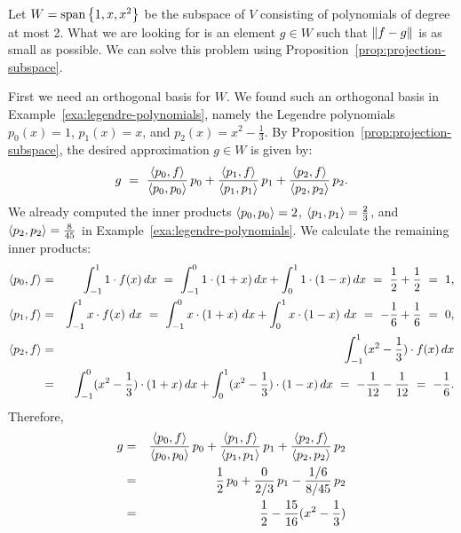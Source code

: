 \begin{solution}
  Let $W=\sspan\set{1,x,x^2}$ be the subspace of $V$ consisting of
  polynomials of degree at most 2. What we are looking for is an
  element $g\in W$ such that $\left\|f-g\right\|$ is as small as possible.  We
  can solve this problem using
  Proposition~\ref{prop:projection-subspace}.

  First we need an orthogonal basis for $W$. We found such an
  orthogonal basis in Example~\ref{exa:legendre-polynomials}, namely
  the Legendre polynomials $p_0(x) = 1$, $p_1(x) = x$, and
  $p_2(x) = x^2-\frac{1}{3}$.  By
  Proposition~\ref{prop:projection-subspace}, the desired
  approximation $g\in W$ is given by:
  \begin{equation*}
    g
    ~=~
    \frac{\langle p_0,f\rangle}{\langle p_0,p_0\rangle}\,p_0
    + \frac{\langle p_1,f\rangle}{\langle p_1,p_1\rangle}\,p_1
    + \frac{\langle p_2,f\rangle}{\langle p_2,p_2\rangle}\,p_2.
  \end{equation*}
  We already computed the inner products $\langle p_0,p_0\rangle=2$,
  $\langle p_1,p_1\rangle=\frac{2}{3}$, and $\langle p_2,p_2\rangle=\frac{8}{45}$ in
  Example~\ref{exa:legendre-polynomials}. We calculate the remaining
  inner products:
  \begin{eqnarray*}
    \langle p_0,f\rangle
    &=& \int_{-1}^{1} 1\cdot f(x)\,dx
        ~=~ \int_{-1}^{0} 1\cdot (1+x)\,dx
        +   \int_{0}^{1} 1\cdot (1-x)\,dx
        ~=~ \frac{1}{2} + \frac{1}{2}
        ~=~ 1, \\
    \langle p_1,f\rangle
    &=& \int_{-1}^{1} x\cdot f(x)\,\,dx
        ~=~ \int_{-1}^{0} x\cdot (1+x)\,\,dx
        +   \int_{0}^{1} x\cdot (1-x)\,\,dx
        ~=~ -\frac{1}{6} + \frac{1}{6}
        ~=~ 0, \\
    \langle p_2,f\rangle
    &=& \int_{-1}^{1} (x^2-\frac{1}{3})\cdot f(x)\,dx \\
    &=& \int_{-1}^{0} (x^2-\frac{1}{3})\cdot (1+x)\,dx
        +   \int_{0}^{1} (x^2-\frac{1}{3})\cdot (1-x)\,dx
        ~=~ - \frac{1}{12} - \frac{1}{12}
        ~=~ -\frac{1}{6}.
  \end{eqnarray*}
  Therefore,
  \begin{eqnarray*}
    g
    &=&
    \frac{\iprod{p_0,f}}{\iprod{p_0,p_0}}\,p_0
        + \frac{\iprod{p_1,f}}{\iprod{p_1,p_1}}\,p_1
        + \frac{\iprod{p_2,f}}{\iprod{p_2,p_2}}\,p_2
    \\
    &=& \frac{1}{2}\,p_0
        + \frac{0}{2/3}\,p_1
        - \frac{1/6}{8/45}\,p_2
    \\
    &=& \frac{1}{2}
        - \frac{15}{16}(x^2-\frac{1}{3})
    \\

\end{eqnarray*}
\end{solution}
